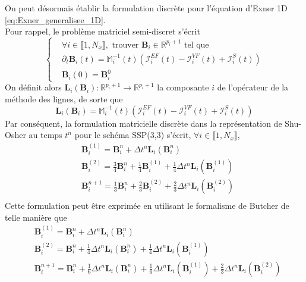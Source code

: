 \documentclass[11pt, a4paper, oneside]{report}
\begin{document}
On peut désormais établir la formulation discrète pour l'équation d'Exner 1D \eqref{eq:Exner_generalisee_1D}. \\
Pour rappel, le problème matriciel semi-discret s'écrit
\begin{equation}
    \left \{
    \begin{aligned}
        &\forall i \in \llbracket 1, N_x \rrbracket, \text{ trouver } \bm{B}_i \in \mathbb{R}^{p_i+1} \text{ tel que} \\
        &\partial_t \bm{B}_i(t) = \mathbb{M}_i^{-1}(t) \left( \bm{\mathcal{I}}_i^{EF}(t) - \bm{\mathcal{I}}_i^{VF}(t) + \bm{\mathcal{I}}_i^S(t) \right) \\
        &\bm{B}_i(0) = \bm{B}_i^0
    \end{aligned}
    \right.
\end{equation}
On définit alors $\displaystyle \bm{L}_i(\bm{B}_i) : \mathbb{R}^{p_i + 1} \longrightarrow \mathbb{R}^{p_i + 1}$ la composante $i$ de l'opérateur de la méthode des lignes, de sorte que
\begin{equation}
    \bm{L}_i(\bm{B}_i) = \mathbb{M}_i^{-1}(t) \left( \bm{\mathcal{I}}_i^{EF}(t) - \bm{\mathcal{I}}_i^{VF}(t) + \bm{\mathcal{I}}_i^S(t) \right)
\end{equation}
Par conséquent, la formulation matricielle discrète dans la représentation de Shu-Osher au temps $t^n$ pour le schéma SSP(3,3) s'écrit, $\forall i \in \llbracket 1, N_x \rrbracket$,
\begin{equation}
    \begin{aligned}
        &\bm{B}_i^{(1)} = \bm{B}_i^n + \Delta t^n \bm{L}_i \left( \bm{B}_i^n \right) \\
        &\bm{B}_i^{(2)} = \frac{3}{4} \bm{B}_i^n + \frac{1}{4} \bm{B}_i^{(1)} + \frac{1}{4} \Delta t^n \bm{L}_i \left( \bm{B}_i^{(1)} \right) \\
        &\bm{B}_i^{n+1} = \frac{1}{3} \bm{B}_i^{n} + \frac{2}{3} \bm{B}_i^{(2)} + \frac{2}{3} \Delta t^n \bm{L}_i \left( \bm{B}_i^{(2)} \right) \\
    \end{aligned}
\end{equation}
Cette formulation peut être exprimée en utilisant le formalisme de Butcher de telle manière que
\begin{equation}
    \begin{aligned}
        &\bm{B}_i^{(1)} = \bm{B}_i^n + \Delta t^n \bm{L}_i \left( \bm{B}_i^n \right) \\
        &\bm{B}_i^{(2)} = \bm{B}_i^n + \frac{1}{4} \Delta t^n \bm{L}_i \left( \bm{B}_i^{n} \right) + \frac{1}{4} \Delta t^n \bm{L}_i \left( \bm{B}_i^{(1)} \right) \\
        &\bm{B}_i^{n+1} = \bm{B}_i^n + \frac{1}{6} \Delta t^n \bm{L}_i \left( \bm{B}_i^{n} \right) + \frac{1}{6} \Delta t^n \bm{L}_i \left( \bm{B}_i^{(1)} \right) + \frac{2}{3} \Delta t^n \bm{L}_i \left( \bm{B}_i^{(2)} \right)
    \end{aligned}
\end{equation}
\end{document}
